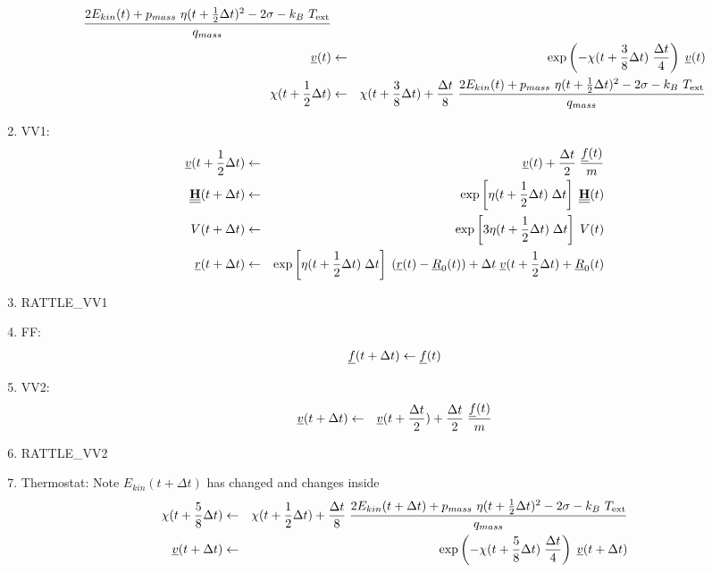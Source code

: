\begin{enumerate}
\begin{eqnarray}
{{2 E_{kin}(t) + p_{mass}~\eta (t + {1 \over 2} \Delta t)^{2} -
2 \sigma - k_{B}~T_{\rm ext}} \over q_{mass}} \nonumber \\
\mbox{$\underline{v}$}(t) &\leftarrow& \exp \left( -\chi (t + {3 \over 8} \Delta t) \;
{\Delta t \over 4} \right) \; \mbox{$\underline{v}$}(t) \\
\chi (t + {1 \over 2} \Delta t) &\leftarrow& \chi (t + {3 \over 8} \Delta t) + {\Delta t \over 8} \;
{{2 E_{kin}(t) + p_{mass}~\eta (t + {1 \over 2} \Delta t)^{2} -
2 \sigma - k_{B}~T_{\rm ext}} \over q_{mass}} \nonumber
\end{eqnarray}
\item VV1:
\begin{eqnarray}
\mbox{$\underline{v}$}(t + {1 \over 2} \Delta t) &\leftarrow& \mbox{$\underline{v}$}(t) +
{\Delta t \over 2} \; {\mbox{$\underline{f}$}(t) \over m} \nonumber \\
\mbox{$\underline{\underline{\bf H}}$}(t + \Delta t) &\leftarrow& \exp \left[
\eta (t + {1 \over 2} \Delta t) \; \Delta t \right] \; \mbox{$\underline{\underline{\bf H}}$}(t) \nonumber \\
V(t + \Delta t) &\leftarrow& \exp \left[3 \eta (t + {1 \over 2} \Delta t) \;
\Delta t \right] \; V(t) \\
\mbox{$\underline{r}$}(t + \Delta t) &\leftarrow& \exp \left[ \eta (t + {1 \over 2} \Delta t) \; \Delta t \right] \;
(\mbox{$\underline{r}$}(t) - \mbox{$\underline{R}$}_{0}(t)) + \Delta t \; \mbox{$\underline{v}$}(t + {1 \over 2} \Delta t) + \mbox{$\underline{R}$}_{0}(t) \nonumber
\end{eqnarray}
\item RATTLE\_VV1
\item FF:
\begin{equation}
\mbox{$\underline{f}$}(t + \Delta t) \leftarrow \mbox{$\underline{f}$}(t)
\end{equation}
\item VV2:
\begin{eqnarray}
\mbox{$\underline{v}$}(t + \Delta t) &\leftarrow& \mbox{$\underline{v}$}(t + {\Delta t \over 2}) +
{\Delta t \over 2} \; {\mbox{$\underline{f}$}(t) \over m}
\end{eqnarray}
\item RATTLE\_VV2
\item Thermostat: Note $E_{kin}(t + \Delta t)$ has changed and changes inside
\begin{eqnarray}
\chi (t + {5 \over 8} \Delta t) &\leftarrow& \chi (t + {1 \over 2} \Delta t) +
{\Delta t \over 8} \; {{2 E_{kin}(t + \Delta t) + p_{mass}~\eta (t + {1 \over 2} \Delta t)^{2} -
2 \sigma - k_{B}~T_{\rm ext}} \over q_{mass}} \nonumber \\
\vek{v}(t + \Delta t) &\leftarrow& \exp \left(-\chi (t + {5 \over 8} \Delta t) \;
{\Delta t \over 4} \right) \; \vek{v}(t + \Delta t) \\

\end{eqnarray}
\end{enumerate}
